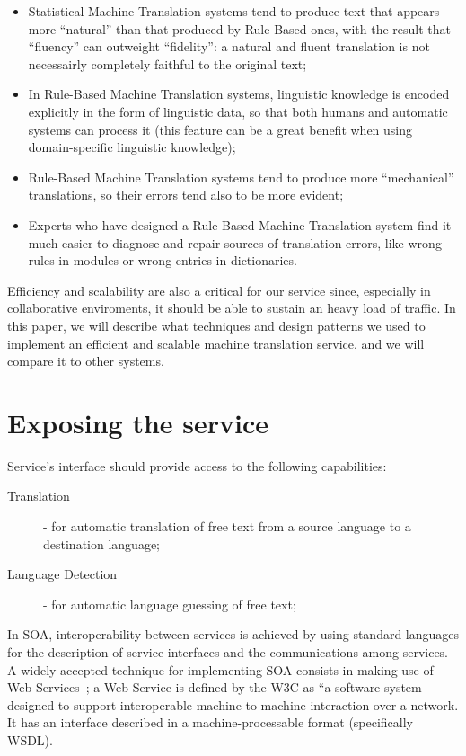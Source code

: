 \documentclass[11pt]{article}
\begin{document}
\begin{itemize}
 \item Statistical Machine Translation systems tend to produce text that appears more ``natural'' than that produced by Rule-Based ones, with the result that ``fluency'' can outweight ``fidelity'': a natural and fluent translation is not necessairly completely faithful to the original text;
 \item In Rule-Based Machine Translation systems, linguistic knowledge is encoded explicitly in the form of linguistic data, so that both humans and automatic systems can process it (this feature can be a great benefit when using domain-specific linguistic knowledge);
 \item Rule-Based Machine Translation systems tend to produce more ``mechanical'' translations, so their errors tend also to be more evident;
 \item Experts who have designed a Rule-Based Machine Translation system find it much easier to diagnose and repair sources of translation errors, like wrong rules in modules or wrong entries in dictionaries.
\end{itemize}

Efficiency and scalability are also a critical for our service since, especially in collaborative enviroments, it should be able to sustain an heavy load of traffic. In this paper, we will describe what techniques and design patterns we used to implement an efficient and scalable machine translation service, and we will compare it to other systems.


\section{Exposing the service}

Service's interface should provide access to the following capabilities:

\begin{description}
  \item[Translation] - for automatic translation of free text from a source language to a destination language;
  \item[Language Detection] - for automatic language guessing of free text;
\end{description}

In SOA, interoperability between services is achieved by using standard languages for the description of service interfaces and the communications among services. A widely accepted technique for implementing SOA consists in making use of Web Services~\citep{soa}; a Web Service is defined by the W3C as ``a software system designed to support interoperable machine-to-machine interaction over a network. It has an interface described in a machine-processable format (specifically WSDL).
\end{document}
